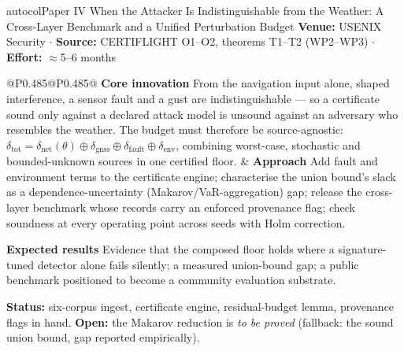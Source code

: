 \documentclass[10pt,a4paper]{article}
\newcommand{\hd}[1]{\textcolor{netcol}{\textbf{#1}}\enspace}
\begin{document}
\begin{card}{autocol}{Paper IV}
  {When the Attacker Is Indistinguishable from the Weather: A Cross-Layer
   Benchmark and a Unified Perturbation Budget}
  {}
\textbf{Venue:} USENIX Security \enspace$\cdot$\enspace
\textbf{Source:} CERTIFLIGHT O1--O2, theorems T1--T2 (WP2--WP3)
\enspace$\cdot$\enspace \textbf{Effort:} $\approx$5--6 months

\begin{tabularx}{\linewidth}{@{}P{0.485\linewidth}@{\hspace{0.03\linewidth}}P{0.485\linewidth}@{}}
\hd{Core innovation} From the navigation input alone, shaped interference, a
sensor fault and a gust are indistinguishable --- so a certificate sound only
against a declared attack model is unsound against an adversary who resembles
the weather. The budget must therefore be source-agnostic:
$\delta_{\mathrm{tot}}=\delta_{\mathrm{net}}(\theta)\oplus\delta_{\mathrm{gnss}}
\oplus\delta_{\mathrm{fault}}\oplus\delta_{\mathrm{env}}$, combining
worst-case, stochastic and bounded-unknown sources in one certified floor.
&
\hd{Approach} Add fault and environment terms to the certificate engine;
characterise the union bound's slack as a dependence-uncertainty
(Makarov/VaR-aggregation) gap; release the cross-layer benchmark whose records
carry an enforced provenance flag; check soundness at every operating point
across seeds with Holm correction.

\hd{Expected results} Evidence that the composed floor holds where a
signature-tuned detector alone fails silently; a measured union-bound gap; a
public benchmark positioned to become a community evaluation substrate.
\end{tabularx}
\textbf{Status:} six-corpus ingest, certificate engine, residual-budget lemma,
provenance flags in hand. \textbf{Open:} the Makarov reduction is \emph{to be
proved} (fallback: the sound union bound, gap reported empirically).
\end{card}
\end{document}
